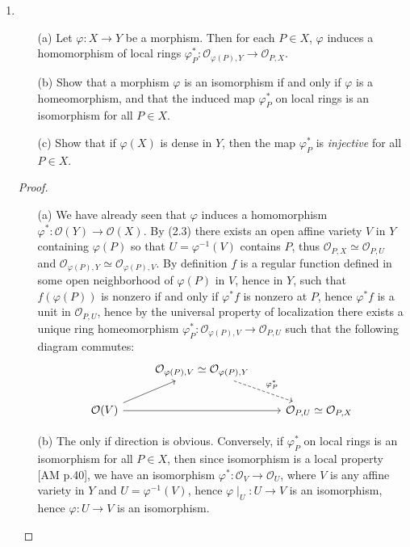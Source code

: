 \documentclass[12pt]{article}
\newcommand{\OO}{\mathcal{O}}
\theoremstyle{definition}
\begin{document}
\begin{enumerate} [label=\textbf{\arabic*.}, leftmargin=-0.05em]
\item \begin{itemize}
    \item[(a)] Let $\varphi : X \to Y$ be a morphism. Then for each $P \in X$, $\varphi$ induces a homomorphism of local rings $\varphi_P^* : \OO_{\varphi(P), Y} \to \OO_{P, X}$.
    \item[(b)] Show that a morphism $\varphi$ is an isomorphism if and only if $\varphi$ is a homeomorphism, and that the induced map $\varphi_P^*$ on local rings is an isomorphism for all $P \in X$.
    \item[(c)] Show that if $\varphi(X)$ is dense in $Y$, then the map $\varphi_P^*$ is \textit{injective} for all $P \in X$.
\end{itemize}

\begin{proof} $ $ \vspace{0pt}
    \begin{itemize}
        \item[(a)] We have already seen that $\varphi$ induces a homomorphism $\varphi^* : \OO(Y) \to \OO(X)$. By (2.3) there exists an open affine variety $V$ in $Y$ containing $\varphi(P)$ so that $U = \varphi^{-1}(V)$ contains $P$, thus $\OO_{P, X} \simeq \OO_{P, U}$ and $\OO_{\varphi(P), Y} \simeq \OO_{\varphi(P), V}$. By definition $f$ is a regular function defined in some open neighborhood of $\varphi(P)$ in $V$, hence in $Y$, such that $f(\varphi(P))$ is nonzero if and only if $\varphi^*f$ is nonzero at $P$, hence $\varphi^*f$ is a unit in $\OO_{P, U}$, hence by the universal property of localization there exists a unique ring homeomorphism $\varphi_P^* : \OO_{\varphi(P), V} \to \OO_{P, U}$ such that the following diagram commutes:
        \filbreak
        \[ \begin{tikzcd}
            & {\OO_{\varphi(P), V} \simeq \OO_{\varphi(P), Y}} \arrow[rd, "\varphi_P^*", dashed] &              \\
            \OO(V) \arrow[rr] \arrow[ru] &                                                         & {\OO_{P, U} \simeq \OO_{P, X}}
        \end{tikzcd} \]

        \item[(b)] The only if direction is obvious. Conversely, if $\varphi_P^*$ on local rings is an isomorphism for all $P \in X$, then since isomorphism is a local property [AM p.40], we have an isomorphism $\varphi^* : \OO_V \to \OO_U$, where $V$ is any affine variety in $Y$ and $U = \varphi^{-1}(V)$, hence $\varphi\mid_U : U \to V$ is an isomorphism, hence $\varphi : U \to V$ is an isomorphism.


\end{itemize}
\end{proof}
\end{enumerate}
\end{document}
